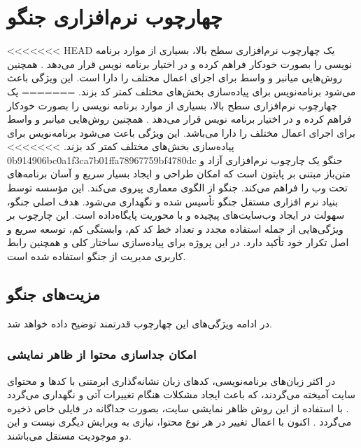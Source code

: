 {{\section{چهارچوب نرم‌افزاری جنگو}
<<<<<<< HEAD
یک چهارچوب نرم‌افزاری سطح بالا، بسیاری از موارد برنامه نویسی را بصورت خودکار فراهم کرده و در اختیار برنامه نویس قرار می‌دهد . همچنین روش‌هایی میانبر و واسط برای اجرای اعمال مختلف را دارا است. این ویژگی باعث می‌شود برنامه‌نویس برای پیاده‌سازی بخش‌های مختلف کمتر کد بزند.
=======
یک چهارچوب نرم‌افزاری سطح بالا، بسیاری از موارد برنامه نویسی را بصورت خودکار فراهم کرده و در اختیار برنامه نویس قرار می‌دهد . همچنین روش‌هایی میانبر و واسط برای اجرای اعمال مختلف را دارا می‌باشد. این ویژگی باعث می‌شود برنامه‌نویس برای پیاده‌سازی بخش‌های مختلف کمتر کد بزند.
>>>>>>> 0b914906bc0a1f3ca7b01ffa78967759bf4780dc
جنگو\cite{Django}  یک چارچوب نرم‌افزاری آزاد و متن‌باز مبتنی بر پایتون است که امکان طراحی و ایجاد بسیار سریع و آسان برنامه‌های تحت وب را فراهم می‌کند. جنگو از الگوی معماری  پیروی می‌کند. این مؤسسه توسط بنیاد نرم افزاری مستقل جنگو تأسیس شده و نگهداری می‌شود.
هدف اصلی جنگو، سهولت در ایجاد وب‌سایت‌های پیچیده و با محوریت پایگاه‌داده است. این چارچوب بر ویژگی‌هایی از جمله استفاده مجدد و تعداد خط کد کم، وابستگی کم، توسعه سریع و اصل تکرار خود تأکید دارد.
در این پروژه برای پیاده‌سازی ساختار کلی  و همچنین رابط کاربری مدیریت از جنگو استفاده شده است.

\subsection{مزیت‌های جنگو}
در ادامه ویژگی‌های این چهارچوب قدرتمند توضیح داده خواهد شد.
\subsubsection{امکان جداسازی محتوا از ظاهر نمایشی}
در اکثر زبان‌های برنامه‌نویسی، کدهای زبان نشانه‌گذاری ابرمتنی با کدها و محتوای سایت آمیخته می‌گردند، که باعث ایجاد مشکلات هنگام تغییرات آتی و نگهداری می‌گردد . با استفاده از این روش ظاهر نمایشی سایت، بصورت جداگانه در فایلی خاص ذخیره می‌گردد . اکنون با اعمال تغییر در هر نوع محتوا، نیازی به ویرایش دیگری نیست و این دو موجودیت مستقل می‌باشند.

}}
